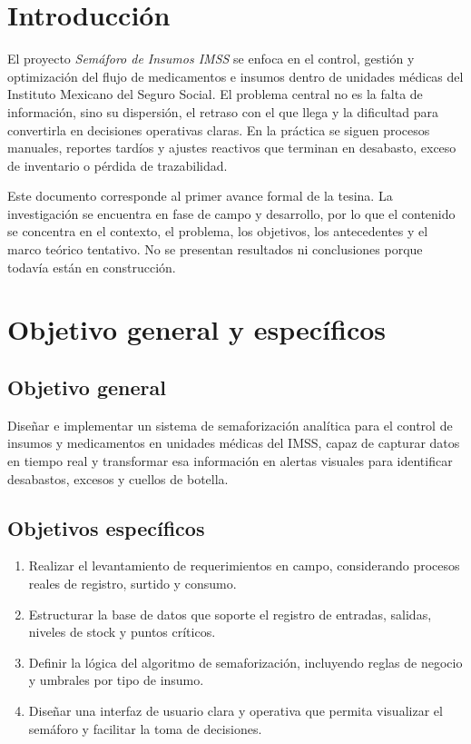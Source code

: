 \section{Introducción}
\label{ch:introduccion}

El proyecto \textit{Semáforo de Insumos IMSS} se enfoca en el control, gestión y optimización del flujo de medicamentos e insumos dentro de unidades médicas del Instituto Mexicano del Seguro Social. El problema central no es la falta de información, sino su dispersión, el retraso con el que llega y la dificultad para convertirla en decisiones operativas claras. En la práctica se siguen procesos manuales, reportes tardíos y ajustes reactivos que terminan en desabasto, exceso de inventario o pérdida de trazabilidad.

Este documento corresponde al primer avance formal de la tesina. La investigación se encuentra en fase de campo y desarrollo, por lo que el contenido se concentra en el contexto, el problema, los objetivos, los antecedentes y el marco teórico tentativo. No se presentan resultados ni conclusiones porque todavía están en construcción.

\section{Objetivo general y específicos}
\label{sec:objetivos}

\subsection{Objetivo general}
\label{subsec:objetivo_general}

Diseñar e implementar un sistema de semaforización analítica para el control de insumos y medicamentos en unidades médicas del IMSS, capaz de capturar datos en tiempo real y transformar esa información en alertas visuales para identificar desabastos, excesos y cuellos de botella.

\subsection{Objetivos específicos}
\label{subsec:objetivos_especificos}

\begin{enumerate}
    \item Realizar el levantamiento de requerimientos en campo, considerando procesos reales de registro, surtido y consumo.
    \item Estructurar la base de datos que soporte el registro de entradas, salidas, niveles de stock y puntos críticos.
    \item Definir la lógica del algoritmo de semaforización, incluyendo reglas de negocio y umbrales por tipo de insumo.
    \item Diseñar una interfaz de usuario clara y operativa que permita visualizar el semáforo y facilitar la toma de decisiones.
\end{enumerate}

